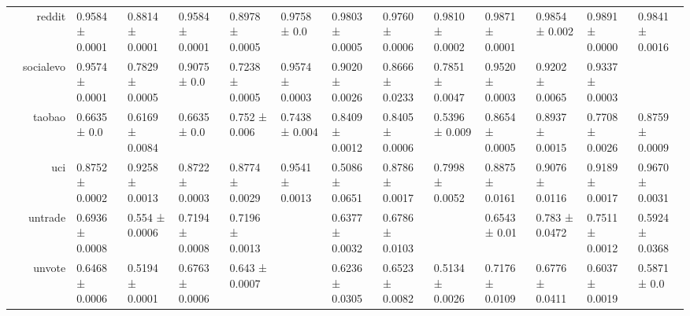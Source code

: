 {\begin{tabular}{@{}crllllllllllll@{}}
                                    & reddit               & 0.9584 ± 0.0001           & 0.8814 ± 0.0001            & 0.9584 ± 0.0001           & 0.8978 ± 0.0005            & \multicolumn{1}{l|}{0.9758 ± 0.0}    & 0.9803 ± 0.0005           & 0.9760 ± 0.0006           & 0.9810 ± 0.0002          & 0.9871 ± 0.0001         & 0.9854 ± 0.002          & 0.9891 ± 0.0000          & 0.9841 ± 0.0016            \\
                                    & socialevo            & 0.9574 ± 0.0001           & 0.7829 ± 0.0005            & 0.9075 ± 0.0              & 0.7238 ± 0.0005            & \multicolumn{1}{l|}{0.9574 ± 0.0003} & 0.9020 ± 0.0026           & 0.8666 ± 0.0233           & 0.7851 ± 0.0047          & 0.9520 ± 0.0003         & 0.9202 ± 0.0065         & 0.9337 ± 0.0003          &                            \\
                                    & taobao               & 0.6635 ± 0.0              & 0.6169 ± 0.0084            & 0.6635 ± 0.0              & 0.752 ± 0.006              & \multicolumn{1}{l|}{0.7438 ± 0.004}  & 0.8409 ± 0.0012           & 0.8405 ± 0.0006           & 0.5396 ± 0.009           & 0.8654 ± 0.0005         & 0.8937 ± 0.0015         & 0.7708 ± 0.0026          & 0.8759 ± 0.0009            \\
                                    & uci                  & 0.8752 ± 0.0002           & 0.9258 ± 0.0013            & 0.8722 ± 0.0003           & 0.8774 ± 0.0029            & \multicolumn{1}{l|}{0.9541 ± 0.0013} & 0.5086 ± 0.0651           & 0.8786 ± 0.0017           & 0.7998 ± 0.0052          & 0.8875 ± 0.0161         & 0.9076 ± 0.0116         & 0.9189 ± 0.0017          & 0.9670 ± 0.0031            \\
                                    & untrade              & 0.6936 ± 0.0008           & 0.554 ± 0.0006             & 0.7194 ± 0.0008           & 0.7196 ± 0.0013            & \multicolumn{1}{l|}{}                & 0.6377 ± 0.0032           & 0.6786 ± 0.0103           &                          & 0.6543 ± 0.01           & 0.783 ± 0.0472          & 0.7511 ± 0.0012          & 0.5924 ± 0.0368            \\
                                    & unvote               & 0.6468 ± 0.0006           & 0.5194 ± 0.0001            & 0.6763 ± 0.0006           & 0.643 ± 0.0007             & \multicolumn{1}{l|}{}                & 0.6236 ± 0.0305           & 0.6523 ± 0.0082           & 0.5134 ± 0.0026          & 0.7176 ± 0.0109         & 0.6776 ± 0.0411         & 0.6037 ± 0.0019          & 0.5871 ± 0.0               \\

\end{tabular}}
